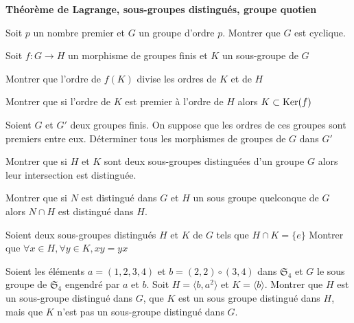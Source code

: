 \documentclass{report}
\begin{document}
\begin{center}
    \huge{\textbf{Théorème de Lagrange, sous-groupes distingués,
    groupe quotien}}
\end{center}

\begin{exo}
    Soit \(p\) un nombre premier et \(G\) un groupe d'ordre \(p\). Montrer que \(G\) est cyclique.
\end{exo}

\begin{exo}
    Soit \(f\colon G\to H\) un morphisme de groupes finis et \(K\) un sous-groupe
    de \(G\)
    \begin{q}{1}
        Montrer que l'ordre de \(f(K)\) divise les ordres de \(K\) et de \(H\)
    \end{q}
    \begin{q}{2}
        Montrer que si l'ordre de \(K\) est premier à l'ordre de \(H\) alors
        \(K \subset \operatorname{Ker}(f)\)
    \end{q}
\end{exo}

\begin{exo}
    Soient \(G\) et \(G'\) deux groupes finis. On suppose que les ordres de ces groupes
    sont premiers entre eux. Déterminer tous les morphismes de groupes de \(G\) dans \(G'\)
\end{exo}

\begin{exo}
    Montrer que si \(H\) et \(K\) sont deux sous-groupes distinguées d'un groupe \(G\)
    alors leur intersection est distinguée.
\end{exo}

\begin{exo}
    Montrer que si \(N\) est distingué dans \(G\) et \(H\) un sous groupe quelconque de
    \(G\) alors \(N\cap H\) est distingué dans \(H\).
\end{exo}

\begin{exo}
    Soient deux sous-groupes distingués \(H\) et \(K\) de \(G\) tels que \(H\cap K=\{e\}\)
    Montrer que \(\forall x\in H,\forall y\in K, xy=yx\)
\end{exo}

\begin{exo}
    Soient les éléments \(a=(1,2,3,4)\) et \(b=(2,2)\circ(3,4)\) dans \(\mathfrak{S}_4\)
    et \(G\) le sous groupe de \(\mathfrak{S}_4\) engendré par \(a\) et \(b\). Soit
    \(H=\langle b,a^2\rangle\) et \(K=\langle b\rangle\). Montrer que \(H\) est un sous-groupe
    distingué dans \(G\), que \(K\) est un sous groupe distingué dans \(H\), mais que
    \(K\) n'est pas un sous-groupe distingué dans \(G\).
\end{exo}
\end{document}
